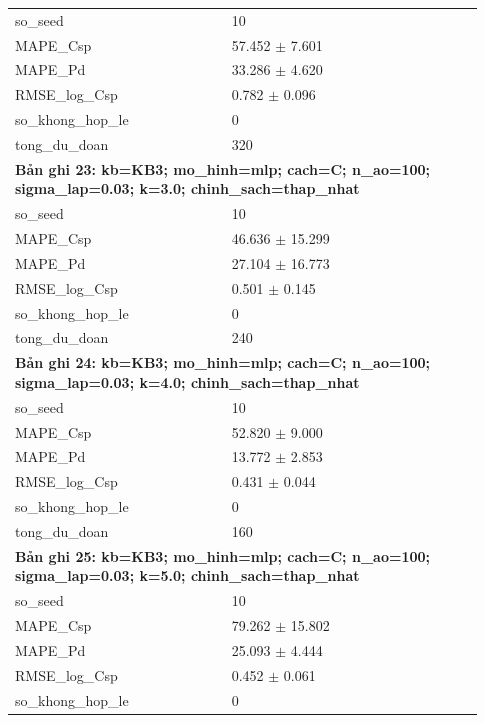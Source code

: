\begin{longtable}{p{0.43\linewidth}p{0.50\linewidth}}
so\_\allowbreak seed & 10 \\
MAPE\_\allowbreak Csp & 57.452 $\pm$ 7.601 \\
MAPE\_\allowbreak Pd & 33.286 $\pm$ 4.620 \\
RMSE\_\allowbreak log\_\allowbreak Csp & 0.782 $\pm$ 0.096 \\
so\_\allowbreak khong\_\allowbreak hop\_\allowbreak le & 0 \\
tong\_\allowbreak du\_\allowbreak doan & 320 \\
\midrule
\multicolumn{2}{p{0.95\linewidth}}{\textbf{Bản ghi 23: kb=KB3; mo\_hinh=mlp; cach=C; n\_ao=100; sigma\_lap=0.03; k=3.0; chinh\_sach=thap\_nhat}} \\
so\_\allowbreak seed & 10 \\
MAPE\_\allowbreak Csp & 46.636 $\pm$ 15.299 \\
MAPE\_\allowbreak Pd & 27.104 $\pm$ 16.773 \\
RMSE\_\allowbreak log\_\allowbreak Csp & 0.501 $\pm$ 0.145 \\
so\_\allowbreak khong\_\allowbreak hop\_\allowbreak le & 0 \\
tong\_\allowbreak du\_\allowbreak doan & 240 \\
\midrule
\multicolumn{2}{p{0.95\linewidth}}{\textbf{Bản ghi 24: kb=KB3; mo\_hinh=mlp; cach=C; n\_ao=100; sigma\_lap=0.03; k=4.0; chinh\_sach=thap\_nhat}} \\
so\_\allowbreak seed & 10 \\
MAPE\_\allowbreak Csp & 52.820 $\pm$ 9.000 \\
MAPE\_\allowbreak Pd & 13.772 $\pm$ 2.853 \\
RMSE\_\allowbreak log\_\allowbreak Csp & 0.431 $\pm$ 0.044 \\
so\_\allowbreak khong\_\allowbreak hop\_\allowbreak le & 0 \\
tong\_\allowbreak du\_\allowbreak doan & 160 \\
\midrule
\multicolumn{2}{p{0.95\linewidth}}{\textbf{Bản ghi 25: kb=KB3; mo\_hinh=mlp; cach=C; n\_ao=100; sigma\_lap=0.03; k=5.0; chinh\_sach=thap\_nhat}} \\
so\_\allowbreak seed & 10 \\
MAPE\_\allowbreak Csp & 79.262 $\pm$ 15.802 \\
MAPE\_\allowbreak Pd & 25.093 $\pm$ 4.444 \\
RMSE\_\allowbreak log\_\allowbreak Csp & 0.452 $\pm$ 0.061 \\
so\_\allowbreak khong\_\allowbreak hop\_\allowbreak le & 0 \\

\end{longtable}
